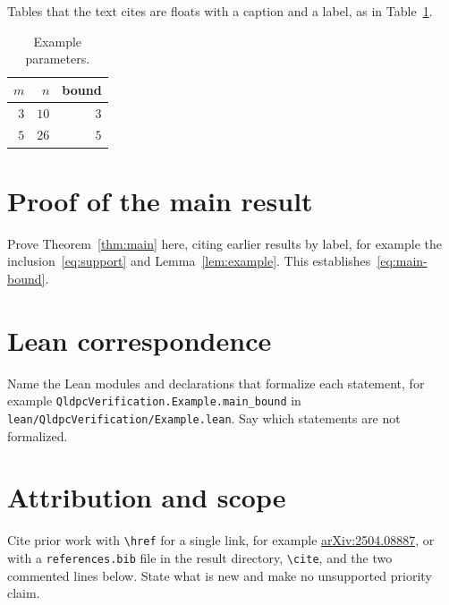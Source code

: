 \documentclass{article}
\theoremstyle{plain}
\theoremstyle{definition}
\theoremstyle{remark}
\begin{document}
Tables that the text cites are floats with a caption and a label, as in
Table~\ref{tab:example}.

\begin{table}[htbp]
  \centering
  \begin{tabular}{rrr}
    \(m\) & \(n\) & bound \\
    \hline
    \(3\) & \(10\) & \(3\) \\
    \(5\) & \(26\) & \(5\) \\
  \end{tabular}
  \caption{Example parameters.}\label{tab:example}
\end{table}

\section{Proof of the main result}\label{sec:proof}

Prove Theorem~\ref{thm:main} here, citing earlier results by label, for
example the inclusion~\eqref{eq:support} and Lemma~\ref{lem:example}. This
establishes~\eqref{eq:main-bound}.

\section{Lean correspondence}\label{sec:lean}

\begin{sloppypar}
Name the Lean modules and declarations that formalize each statement, for
example \texttt{QldpcVerification.Example.main\_bound} in
\texttt{lean/QldpcVerification/Example.lean}. Say which statements are not
formalized.
\end{sloppypar}

\section{Attribution and scope}\label{sec:attribution}

Cite prior work with \verb|\href| for a single link, for example
\href{https://arxiv.org/abs/2504.08887}{arXiv:2504.08887}, or with a
\texttt{references.bib} file in the result directory, \verb|\cite|, and the
two commented lines below. State what is new and make no unsupported
priority claim.

% 
% 
\end{document}
